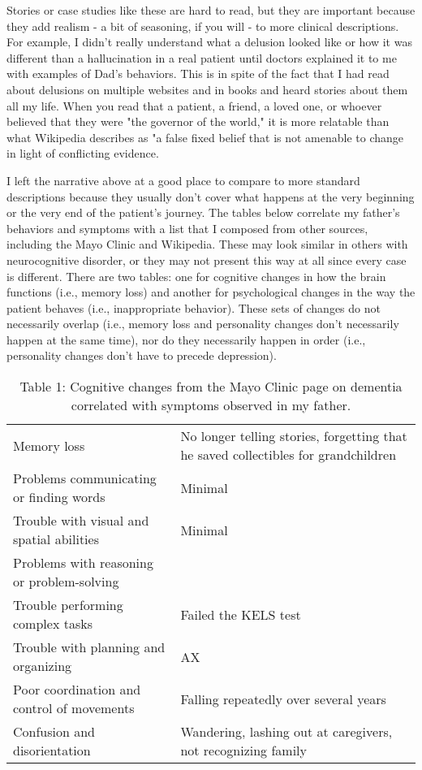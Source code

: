 \documentclass{article}
\begin{document}
Stories or case studies like these are hard to read, but they are important because they add realism - a bit of seasoning, if you will - to more clinical descriptions. For example, I didn't really understand what a delusion looked like or how it was different than a hallucination in a real patient until doctors explained it to me with examples of Dad's behaviors. This is in spite of the fact that I had read about delusions on multiple websites and in books and heard stories about them all my life. When you read that a patient, a friend, a loved one, or whoever believed that they were "the governor of the world," it is more relatable than what Wikipedia describes as "a false fixed belief that is not amenable to change in light of conflicting evidence. 

I left the narrative above at a good place to compare to more standard descriptions because they usually don't cover what happens at the very beginning or the very end of the patient's journey. The tables below correlate my father's behaviors and symptoms with a list that I composed from other sources, including the Mayo Clinic and Wikipedia. These may look similar in others with neurocognitive disorder, or they may not present this way at all since every case is different. There are two tables: one for cognitive changes in how the brain functions (i.e., memory loss) and another for psychological changes in the way the patient behaves (i.e., inappropriate behavior). These sets of changes do not necessarily overlap (i.e., memory loss and personality changes don't necessarily happen at the same time), nor do they necessarily happen in order (i.e., personality changes don't have to precede depression).

\begin{table}[h!]
\centering
\begin{tabularx}{ 0.8\textwidth }{ | >{\raggedright\arraybackslash}X | >{\centering\arraybackslash}X | }
 \hline
 \multicolumn{2}{|c|}{Cognitive Changes} \\
 \hline
 Memory loss& No longer telling stories, forgetting that he saved collectibles for grandchildren\\
 \hline
 Problems communicating or finding words & Minimal  \\
 \hline
 Trouble with visual and spatial abilities&  Minimal \\
 \hline
 Problems with reasoning or problem-solving&  \\
 \hline
 Trouble performing complex tasks & Failed the KELS test  \\
 \hline
 Trouble with planning and organizing&   AX  \\
 \hline
 Poor coordination and control of movements & Falling repeatedly over several years  \\
 \hline
 Confusion and disorientation & Wandering, lashing out at caregivers, not recognizing family  \\
 \hline
\end{tabularx}
\caption{Table 1: Cognitive changes from the Mayo Clinic page on dementia correlated with symptoms observed in my father.}
\end{table}
\end{document}
